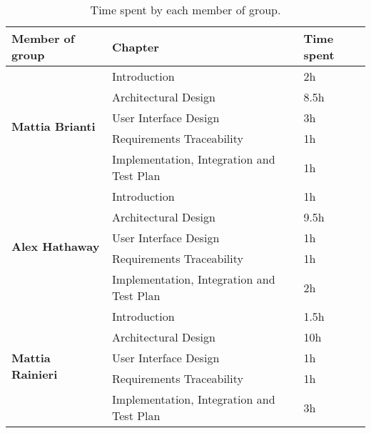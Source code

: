 \begin{table}[H]
    \centering
    \begin{tabular}{|l|l|l|}
        \hline
        \textbf{Member of group }                  & \textbf{Chapter}                          & \textbf{Time spent} \\\hline
        \multirow{5}{*}{\textbf{Mattia Brianti}} & Introduction                              & 2h                  \\
                                                   & Architectural Design                      & 8.5h               \\
                                                   & User Interface Design                     & 3h                  \\
                                                   & Requirements Traceability                 & 1h                  \\
                                                   & Implementation, Integration and Test Plan & 1h                  \\\hline
        \multirow{5}{*}{\textbf{Alex Hathaway}} & Introduction                              & 1h                  \\
                                                   & Architectural Design                      & 9.5h               \\
                                                   & User Interface Design                     & 1h                  \\
                                                   & Requirements Traceability                 & 1h                  \\
                                                   & Implementation, Integration and Test Plan & 2h                  \\\hline
        \multirow{5}{*}{\textbf{Mattia Rainieri}} & Introduction                              & 1.5h                \\
                                                   & Architectural Design                      & 10h                  \\
                                                   & User Interface Design                     & 1h                  \\
                                                   & Requirements Traceability                 & 1h                  \\
                                                   & Implementation, Integration and Test Plan & 3h                  \\\hline
    \end{tabular}
    \caption{Time spent by each member of group.}
    \label{table:Time spent}
\end{table}
